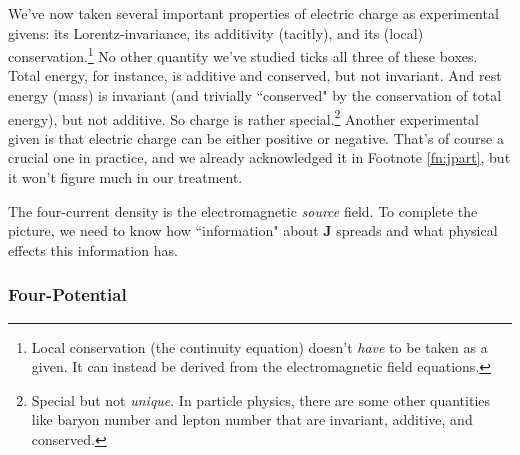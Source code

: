 \documentclass[12pt]{article}
\renewcommand{\vv}[1]{\mathbf{#1}}
\begin{document}
We've now taken several important properties of electric charge as experimental givens: its Lorentz-invariance, its additivity (tacitly), and its (local) conservation.\footnote{Local conservation (the continuity equation) doesn't \emph{have} to be taken as a given. It can instead be derived from the electromagnetic field equations.} No other quantity we've studied ticks all three of these boxes. Total energy, for instance, is additive and conserved, but not invariant. And rest energy (mass) is invariant (and trivially ``conserved" by the conservation of total energy), but not additive. So charge is rather special.\footnote{Special but not \emph{unique}. In particle physics, there are some other quantities like baryon number and lepton number that are invariant, additive, and conserved.} Another experimental given is that electric charge can be either positive or negative. That's of course a crucial one in practice, and we already acknowledged it in Footnote \ref{fn:jpart}, but it won't figure much in our treatment.

The four-current density is the electromagnetic \emph{source} field. To complete the picture, we need to know how ``information" about $\vv J$ spreads and what physical effects this information has.


\subsubsection{Four-Potential}\label{sssec:fp}
\end{document}
